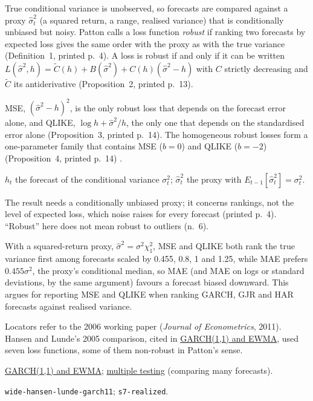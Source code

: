 \begin{qfmethod}\label{meth:volatility-forecast-loss}
 True conditional variance is unobserved, so forecasts are compared against a proxy $\hat\sigma^2_t$ (a squared return, a range, realised variance) that is conditionally unbiased but noisy. Patton calls a loss function \emph{robust} if ranking two forecasts by expected loss gives the same order with the proxy as with the true variance (Definition~1, printed p.~4). A loss is robust if and only if it can be written $L(\hat\sigma^2,h)=\tilde C(h)+B(\hat\sigma^2)+C(h)(\hat\sigma^2-h)$ with $C$ strictly decreasing and $\tilde C$ its antiderivative (Proposition~2, printed p.~13).

MSE, $(\hat\sigma^2-h)^2$, is the only robust loss that depends on the forecast error alone, and QLIKE, $\log h+\hat\sigma^2/h$, the only one that depends on the standardised error alone (Proposition~3, printed p.~14). The homogeneous robust losses form a one-parameter family that contains MSE ($b=0$) and QLIKE ($b=-2$) (Proposition~4, printed p.~14) \citep[UTS QFRC Research Paper~175, April 2006, secs.~2--3, printed pp.~4--14]{wide-patton-robust-loss}.

 $h_t$ the forecast of the conditional variance $\sigma^2_t$; $\hat\sigma^2_t$ the proxy with $E_{t-1}[\hat\sigma^2_t]=\sigma^2_t$.

 The result needs a conditionally unbiased proxy; it concerns rankings, not the level of expected loss, which noise raises for every forecast (printed p.~4). ``Robust'' here does not mean robust to outliers (n.~6).

 With a squared-return proxy, $\hat\sigma^2=\sigma^2\chi^2_1$, MSE and QLIKE both rank the true variance first among forecasts scaled by 0.455, 0.8, 1 and 1.25, while MAE prefers $0.455\sigma^2$, the proxy's conditional median, so MAE (and MAE on logs or standard deviations, by the same argument) favours a forecast biased downward. This argues for reporting MSE and QLIKE when ranking GARCH, GJR and HAR forecasts against realised variance.

 Locators refer to the 2006 working paper (\emph{Journal of Econometrics}, 2011). Hansen and Lunde's 2005 comparison, cited in \hyperref[mod:garch-volatility-forecast]{GARCH(1,1) and EWMA}, used seven loss functions, some of them non-robust in Patton's sense.

 \hyperref[mod:garch-volatility-forecast]{GARCH(1,1) and EWMA}; \hyperref[meth:multiple-testing-control]{multiple testing} (comparing many forecasts).

 \nolinkurl{wide-hansen-lunde-garch11}; \nolinkurl{s7-realized}.

\end{qfmethod}

